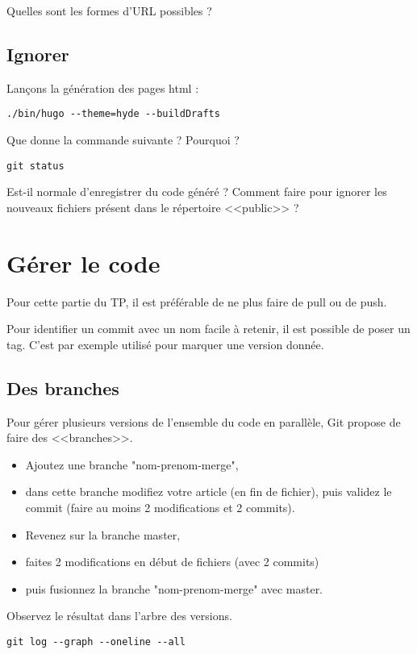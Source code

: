 \documentclass[a4paper]{article}
\begin{document}
Quelles sont les formes d'URL possibles ?

\subsection{Ignorer}

Lançons la génération des pages html : 
\begin{verbatim}
./bin/hugo --theme=hyde --buildDrafts
\end{verbatim}

Que donne la commande suivante ? Pourquoi ? 
\begin{verbatim}
git status
\end{verbatim}

Est-il normale d'enregistrer du code généré ?  Comment faire pour ignorer les nouveaux fichiers présent dans le répertoire <<public>> ?

\section{Gérer le code}

Pour cette partie du TP, il est préférable de ne plus faire de pull ou de push.

Pour identifier un commit avec un nom facile à retenir, il est possible de poser un tag. C'est par exemple utilisé pour marquer une version donnée.

\subsection{Des branches}

Pour gérer plusieurs versions de l'ensemble du code en parallèle, Git propose de faire des <<branches>>.

\begin{itemize}
  \item Ajoutez une branche "nom-prenom-merge", 
  \item dans cette branche modifiez votre article (en fin de fichier), puis validez le commit (faire au moins 2 modifications et 2 commits). 
  \item Revenez sur la branche master, 
  \item faites 2 modifications en début de fichiers (avec 2 commits) 
  \item puis fusionnez la branche "nom-prenom-merge" avec master.
\end{itemize}

Observez le résultat dans l'arbre des versions. 
\begin{verbatim}
git log --graph --oneline --all
\end{verbatim}
\end{document}
